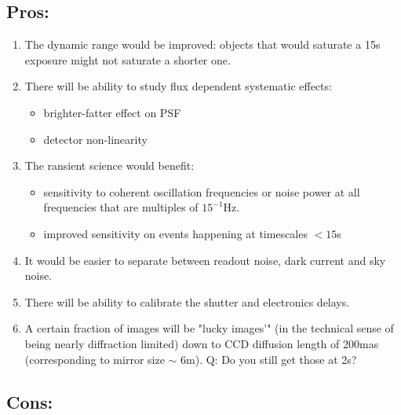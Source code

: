 \documentclass[12pt, a4paper]{article}
\begin{document}
\subsection*{Pros:}

\begin{enumerate}
\item The  dynamic range would be improved: objects that would saturate a 15s
  exposure might not saturate a shorter one.

\item There will be ability to study flux dependent systematic effects:
  \begin{itemize}
  \item brighter-fatter effect on PSF
  \item detector non-linearity
  \end{itemize}

\item The ransient science would benefit:
  \begin{itemize}
  \item sensitivity to coherent oscillation frequencies or noise power at all
    frequencies that are multiples  of $15^{-1}$Hz.
  \item improved sensitivity on events happening at timescales $<15$s 
  \end{itemize}

\item It would be easier to separate between readout noise, dark
  current and sky noise.

\item There will be ability to calibrate the shutter and electronics delays.

\item A certain fraction of images will be "lucky images'" (in the
  technical sense of being nearly diffraction limited) down to
  CCD diffusion length of 200mas (corresponding to mirror size $\sim$
  6m). Q: Do you still get those at 2s?

\end{enumerate}

\subsection*{Cons:}
\end{document}
